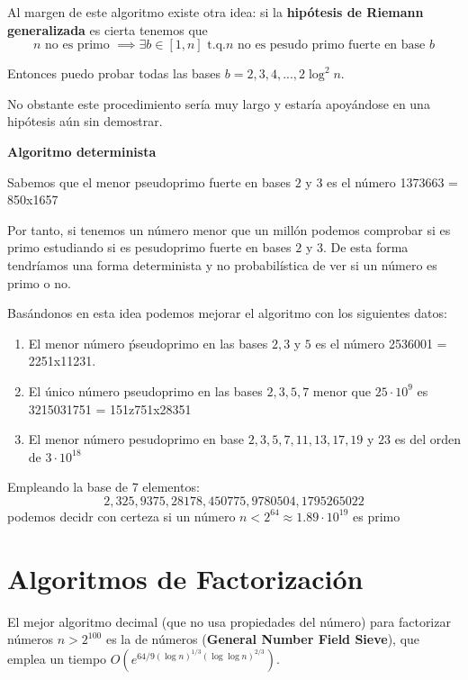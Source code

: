 Al margen de este algoritmo existe otra idea: si la \textbf{hipótesis de Riemann generalizada} es cierta tenemos que
\[n \text{ no es primo } \implies \exists b \in [1,n] \text{ t.q.} n \text{ no es pesudo primo fuerte en base } b\]

Entonces puedo probar todas las bases $b=2,3,4,...,2\log^2 n$.

No obstante este procedimiento sería muy largo y estaría apoyándose en una hipótesis aún sin demostrar.

\begin{example}\textbf{Algoritmo determinista}

Sabemos que el menor pseudoprimo fuerte en bases $2$ y $3$ es el número 1373663 = 850x1657

Por tanto, si tenemos un número menor que un millón podemos comprobar si es primo estudiando si es pesudoprimo fuerte en bases $2$ y $3$. De esta forma tendríamos una forma determinista y no probabilística de ver si un número es primo o no.

Basándonos en esta idea podemos mejorar el algoritmo con los siguientes datos:
\begin{enumerate}
\item El menor número ṕseudoprimo en las bases $2,3$ y $5$ es el número 2536001 = 2251x11231.

\item El único número pseudoprimo en las bases $2,3,5,7$ menor que $25 \cdot 10^9$ es 3215031751 = 151z751x28351

\item El menor número pesudoprimo en base $2,3,5,7,11,13,17,19$ y $23$ es del orden de $3 \cdot 10^{18}$

\end{enumerate}
\end{example}

\begin{theorem}
Empleando la base de 7 elementos:
\[2,325,9375,28178,450775,9780504,1795265022\]
podemos decidr con certeza si un número $n<2^{64}\approx 1.89\cdot 10^{19}$ es primo
\end{theorem}

\section{Algoritmos de Factorización}
El mejor algoritmo decimal (que no usa propiedades del número) para factorizar números $n>2^{100}$ es la  de números (\textbf{General Number Field Sieve}), que emplea un tiempo $O\left(e^{64/9 (\log n)^{1/3}(\log\log n)^{2/3}} \right)$.

